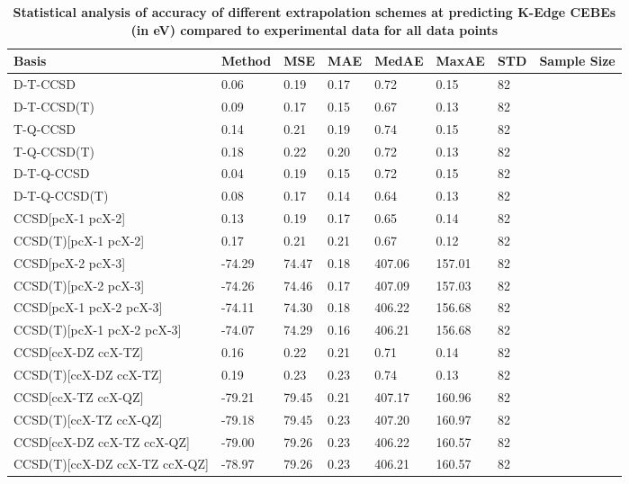 \begin{table}
  \caption{\textbf{Statistical analysis of accuracy of different extrapolation schemes at predicting K-Edge CEBEs (in eV) compared to experimental data for all data points}}
  \label{tbl:extrap-all-summary}
  \begin{tabular}{l l l l l l l l }
    \toprule
    \textbf{Basis} & \textbf{Method} & \textbf{MSE} & \textbf{MAE} & \textbf{MedAE} & \textbf{MaxAE} & \textbf{STD} & \textbf{Sample Size} \\ 
    \midrule
    D-T-CCSD & 0.06 & 0.19 & 0.17 & 0.72 & 0.15 & 82 \\ 
    D-T-CCSD(T) & 0.09 & 0.17 & 0.15 & 0.67 & 0.13 & 82 \\ 
    T-Q-CCSD & 0.14 & 0.21 & 0.19 & 0.74 & 0.15 & 82 \\ 
    T-Q-CCSD(T) & 0.18 & 0.22 & 0.20 & 0.72 & 0.13 & 82 \\ 
    D-T-Q-CCSD & 0.04 & 0.19 & 0.15 & 0.72 & 0.15 & 82 \\ 
    D-T-Q-CCSD(T) & 0.08 & 0.17 & 0.14 & 0.64 & 0.13 & 82 \\ 
    CCSD[pcX-1 pcX-2] & 0.13 & 0.19 & 0.17 & 0.65 & 0.14 & 82 \\ 
    CCSD(T)[pcX-1 pcX-2] & 0.17 & 0.21 & 0.21 & 0.67 & 0.12 & 82 \\ 
    CCSD[pcX-2 pcX-3] & -74.29 & 74.47 & 0.18 & 407.06 & 157.01 & 82 \\ 
    CCSD(T)[pcX-2 pcX-3] & -74.26 & 74.46 & 0.17 & 407.09 & 157.03 & 82 \\ 
    CCSD[pcX-1 pcX-2 pcX-3] & -74.11 & 74.30 & 0.18 & 406.22 & 156.68 & 82 \\ 
    CCSD(T)[pcX-1 pcX-2 pcX-3] & -74.07 & 74.29 & 0.16 & 406.21 & 156.68 & 82 \\ 
    CCSD[ccX-DZ ccX-TZ] & 0.16 & 0.22 & 0.21 & 0.71 & 0.14 & 82 \\ 
    CCSD(T)[ccX-DZ ccX-TZ] & 0.19 & 0.23 & 0.23 & 0.74 & 0.13 & 82 \\ 
    CCSD[ccX-TZ ccX-QZ] & -79.21 & 79.45 & 0.21 & 407.17 & 160.96 & 82 \\ 
    CCSD(T)[ccX-TZ ccX-QZ] & -79.18 & 79.45 & 0.23 & 407.20 & 160.97 & 82 \\ 
    CCSD[ccX-DZ ccX-TZ ccX-QZ] & -79.00 & 79.26 & 0.23 & 406.22 & 160.57 & 82 \\ 
    CCSD(T)[ccX-DZ ccX-TZ ccX-QZ] & -78.97 & 79.26 & 0.23 & 406.21 & 160.57 & 82 \\ 
    \bottomrule
  \end{tabular}
\end{table}
